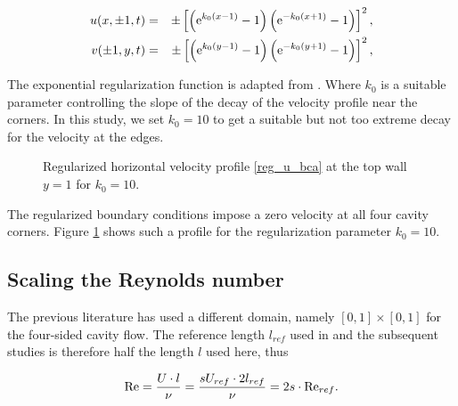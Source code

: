 \begin{eqnarray}
u(x,\pm 1,t) & = & \pm\left[\left(\mathrm{e}^{k_0(x - 1)} - 1\right)
  \left(\mathrm{e}^{-k_0(x + 1)} - 1\right)\right]^2,\label{reg_u_bca} \\
v(\pm 1,y,t) & = & \pm\left[\left(\mathrm{e}^{k_0(y - 1)} - 1\right)
  \left(\mathrm{e}^{-k_0(y + 1)} - 1\right)\right]^2,\label{reg_u_bcb}
\end{eqnarray}

The exponential regularization function is adapted from \citet{lopez2017}. Where
$k_0$ is a suitable parameter controlling the slope of the decay of the
velocity profile near the corners. In this study, we set $k_0=10$ to get a
suitable but not too extreme decay for the velocity at the edges. 

\begin{figure}[ht]
\center
{}
\caption{\label{bc_profile} Regularized horizontal velocity profile
  \eqref{reg_u_bca} at the top wall $y=1$ for $k_0=10$.}
\end{figure}

The regularized boundary conditions impose a zero velocity at all four cavity
corners. Figure \ref{bc_profile} shows such a profile for the regularization
parameter $k_0=10$.

\subsection{Scaling the Reynolds number} \label{sec:scale}

The previous literature has used a different domain, namely $[0,1] \times
[0,1]$ for the four-sided cavity flow. The reference length $l_{ref}$ used in
\citet{wahba2009} and the subsequent studies is therefore half the length $l$
used here, thus

\begin{align}
\mathrm{Re} = \frac{U \cdot l}{\nu} 
  = \frac{sU_{ref} \cdot 2l_{ref}}{\nu} = 2s \cdot \mathrm{Re}_{ref}.
\end{align}

